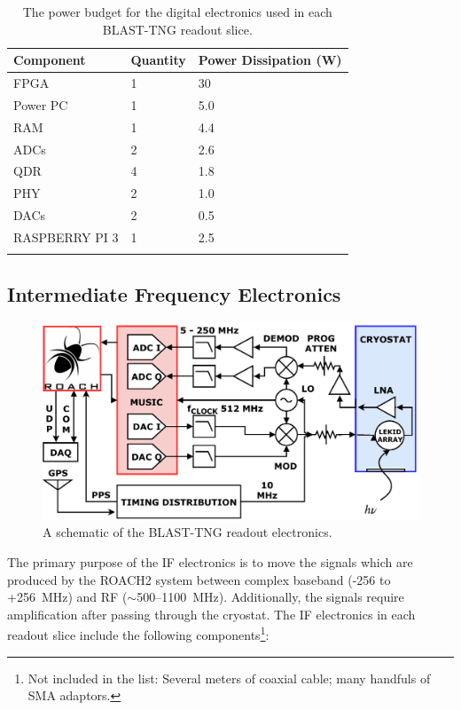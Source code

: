 \begin{table}[!htbp]
\centering
\begin{tabular}{@{}lll@{}}
\dtoprule
Component & Quantity & Power Dissipation (W) \\ \midrule
FPGA & 1 & 30 \\
Power PC & 1 & 5.0 \\
RAM & 1 & 4.4 \\
ADCs & 2 & 2.6 \\
QDR & 4 & 1.8 \\
PHY & 2 & 1.0 \\
DACs & 2 & 0.5 \\
RASPBERRY PI 3 & 1 & 2.5 \\ \dbottomrule
\\
\end{tabular}
\caption[~The power budget for the digital electronics used in each BLAST-TNG readout slice.]{The power budget for the digital electronics used in each BLAST-TNG readout slice.}
\label{tab:dig power budget}
\end{table}

\subsection{Intermediate Frequency Electronics}\label{if electronics}

\begin{figure}
\centering
\includegraphics[width=\textwidth]{figures/readout/schematics/readoutHardwareDefense}
\caption{A schematic of the BLAST-TNG readout electronics.}
\label{fig:hw schematic}
\end{figure}

The primary purpose of the IF electronics is to move the signals which are produced by the ROACH2 system between complex baseband (-256 to +256~MHz) and RF ($\sim$500--1100~MHz). Additionally, the signals require amplification after passing through the cryostat. The IF electronics in each readout slice include the following components\footnote{Not included in the list: Several meters of coaxial cable; many handfuls of SMA adaptors.}:

